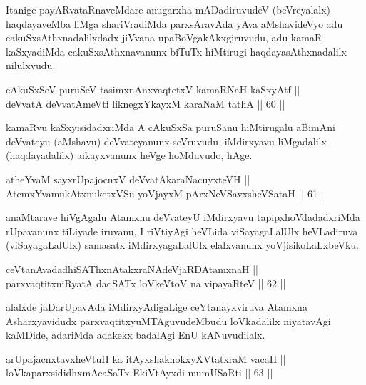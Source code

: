 \begin{artha}
Itanige payARvataRnaveMdare anugarxha mADadiruvudeV (beVreyalalx)
haqdayaveMba liMga shariVradiMda parxsAravAda yAva aMshavideVyo adu
cakuSxsAthxnadalilxdadx jiVvana upaBoVgakAkxgiruvudu, adu kamaR kaSxyadiMda
cakuSxsAthxnavanunx biTuTx hiMtirugi haqdayasAthxnadalilx nilulxvudu.
\end{artha}


\begin{shl}
cAkuSxSeV puruSeV tasimxnAnxvaqtetxV kamaRNaH kaSxyAtf || \\
deVvatA deVvatAmeVti liknegxYkayxM karaNaM tathA \hfill || 60 ||  
\end{shl}

\begin{artha}
kamaRvu kaSxyisidadxriMda A cAkuSxSa puruSanu hiMtirugalu aBimAni
deVvateyu (aMshavu) deVvateyanunx seVruvudu, iMdirxyavu liMgadalilx
(haqdayadalilx) aikayxvanunx heVge hoMduvudo, hAge.
\end{artha}

\begin{shl}
atheYvaM sayxrUpajocnxV deVvatAkaraNacuyxteVH ||  \\
AtemxYvamukAtxnuketxVSu yoVjayxM pArxNeVSavxsheVSataH \hfill || 61 ||  
\end{shl}

\begin{artha}
anaMtarave hiVgAgalu Atamxnu deVvateyU iMdirxyavu tapipxhoVdadadxriMda
rUpavanunx tiLiyade iruvanu, I riVtiyAgi heVLida viSayagaLalUlx
heVLadiruva (viSayagaLalUlx) samasatx iMdirxyagaLalUlx elalxvanunx
yoVjisikoLaLxbeVku.
\end{artha}

\begin{shl}
ceVtanAvadadhiSAThxnAtakxraNAdeVjaRDAtamxnaH || \\
parxvaqtitxniRyatA daqSATx loVkeV\s toV na vipayaRteV \hfill || 62 ||  
\end{shl}

\begin{artha}
alalxde jaDarUpavAda iMdirxyAdigaLige ceYtanayxviruva Atamxna
Asharxyavidudx parxvaqtitxyuMTAguvudeMbudu loVkadalilx niyatavAgi
kaMDide, adariMda adakekx badalAgi EnU kANuvudilalx.
\end{artha}

\begin{shl}
arUpajacnxtavxheVtuH ka itAyxshaknokxyXVtatxraM vacaH || \\
loVkaparxsididhxmAcaSaTx EkiVtAyxdi mumUSaRti \hfill || 63 ||  
\end{shl}

